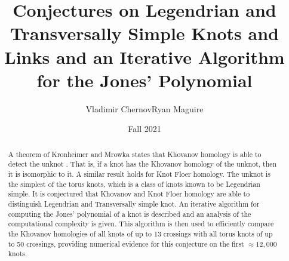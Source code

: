 \documentclass{article}
\title{Conjectures on Legendrian and Transversally Simple Knots and Links and an
       Iterative Algorithm for the Jones' Polynomial}
\author{Vladimir Chernov\hspace{2em}Ryan Maguire}
\date{Fall 2021}
\theoremstyle{plain}
\begin{document}
    \maketitle
    \tableofcontents
    \begin{abstract}
        \noindent
        A theorem of Kronheimer and Mrowka states that Khovanov homology is
        able to detect the unknot \cite{kronheimermrowka2010}. That is, if a
        knot has the Khovanov homology of the unknot, then it is
        isomorphic to it. A similar result holds for Knot Floer
        homology. The unknot is the simplest of the torus knots, which is a
        class of knots known to be Legendrian simple. It is conjectured that
        Khovanov and Knot Floer homology are able to distinguish Legendrian
        and Transversally simple knot. An iterative algorithm for computing
        the Jones' polynomial of a knot is described and an analysis of the
        computational complexity is given. This algorithm is then used to
	efficiently compare the Khovanov homologies of all knots of up to 13
	crossings with all torus knots of up to 50 crossings, providing
	numerical evidence for this conjecture on the first $\approx12,000$
	knots.
    \end{abstract}
\end{document}
